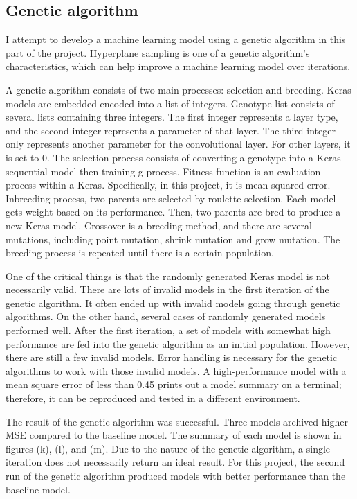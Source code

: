 \documentclass[11pt, natbib=false]{article}
\begin{document}
\subsection{Genetic algorithm}
I attempt to develop a machine learning model using a genetic algorithm in this part of the project.
Hyperplane sampling is one of a genetic algorithm's characteristics, which can help improve a machine learning model over iterations.

A genetic algorithm consists of two main processes: selection and breeding.
Keras models are embedded encoded into a list of integers.
Genotype list consists of several lists containing three integers.
The first integer represents a layer type, and the second integer represents a parameter of that layer.
The third integer only represents another parameter for the convolutional layer.
For other layers, it is set to 0.
The selection process consists of converting a genotype into a Keras sequential model then training g process.
Fitness function is an evaluation process within a Keras.
Specifically, in this project, it is mean squared error.
Inbreeding process, two parents are selected by roulette selection.
Each model gets weight based on its performance.
Then, two parents are bred to produce a new Keras model.
Crossover is a breeding method, and there are several mutations, including point mutation, shrink mutation and grow mutation.
The breeding process is repeated until there is a certain population.

One of the critical things is that the randomly generated Keras model is not necessarily valid.
There are lots of invalid models in the first iteration of the genetic algorithm.
It often ended up with invalid models going through genetic algorithms. On the other hand, several cases of randomly generated models performed well.
After the first iteration, a set of models with somewhat high performance are fed into the genetic algorithm as an initial population.
However, there are still a few invalid models.
Error handling is necessary for the genetic algorithms to work with those invalid models.
A high-performance model with a mean square error of less than 0.45 prints out a model summary on a terminal; therefore, it can be reproduced and tested in a different environment.

The result of the genetic algorithm was successful.
Three models archived higher MSE compared to the baseline model.
The summary of each model is shown in figures (k), (l), and (m).
Due to the nature of the genetic algorithm, a single iteration does not necessarily return an ideal result.
For this project, the second run of the genetic algorithm produced models with better performance than the baseline model.
\end{document}
